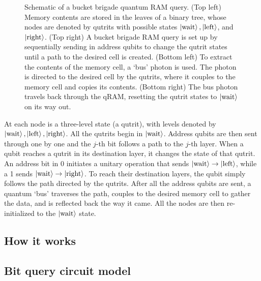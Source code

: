 \documentclass[a4paper,10pt]{article}
\begin{document}
{{\begin{figure}
\begin{subfigure}
    \end{subfigure}
    \caption{Schematic of a bucket brigade quantum RAM query. (Top left) Memory contents are stored in the leaves of a binary tree, whose nodes are denoted by qutrits with possible states $\ket{\hbox{wait}}, \ket{\hbox{left}}$, and $\ket{\hbox{right}}$. (Top right) A bucket brigade RAM query is set up by sequentially sending in address qubits to change the qutrit states until a path to the desired cell is created. (Bottom left) To extract the contents of the memory cell, a `bus' photon is used. The photon is directed to the desired cell by the qutrits, where it couples to the memory cell and copies its contents. (Bottom right) The bus photon travels back through the qRAM, resetting the qutrit states to $\ket{\hbox{wait}}$ on its way out.}
\end{figure}


At each node is a three-level state (a qutrit), with levels denoted by $\ket{\hbox{wait}}, \ket{\hbox{left}}, \ket{\hbox{right}}$. All the qutrits begin in $\ket{\hbox{wait}}$. Address qubits are then sent through one by one and the $j$-th bit follows a path to the $j$-th layer. When a qubit reaches a qutrit in its destination layer, it changes the state of that qutrit. An address bit in 0 initiates a unitary operation that sends $\ket{\hbox{wait}} \rightarrow \ket{\hbox{left}}$, while a 1 sends $\ket{\hbox{wait}} \rightarrow \ket{\hbox{right}}$. To reach their destination layers, the qubit simply follows the path directed by the qutrits. After all the address qubits are sent, a quantum `bus' traverses the path, couples to the desired memory cell to gather the data, and is reflected back the way it came. All the nodes are then re-initialized to the $\ket{\hbox{wait}}$ state.


\subsection{How it works}

\subsection{Bit query circuit model}

}}
\end{document}
